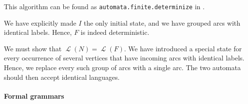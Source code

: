 \begin{comments}
  \item This algorithm can be found as \texttt{automata.finite.determinize} in \cite{code}.
\end{comments}
\begin{defproof}
  We have explicitly made \( I \) the only initial state, and we have grouped arcs with identical labels. Hence, \( F \) is indeed deterministic.

  We must show that \( \mscrL(N) = \mscrL(F) \). We have introduced a special state for every occurrence of several vertices that have incoming arcs with identical labels. Hence, we replace every such group of arcs with a single arc. The two automata should then accept identical languages.
\end{defproof}

\paragraph{Formal grammars}

